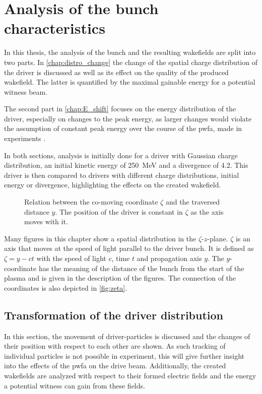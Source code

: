 \documentclass[bachelor_thesis]{subfiles}
\begin{document}
\chapter{Analysis of the bunch characteristics}\label{chap:analysis}
In this thesis, the analysis of the bunch and the resulting wakefields are split into two parts. In \autoref{chap:distro_change} the change of the spatial charge distribution of the driver is discussed 
as well as its effect on the quality of the produced wakefield. The latter is quantified by the maximal gainable energy for a potential witness beam.

The second part in \autoref{chap:E_shift} focuses on the energy distribution of the driver, especially on changes to the peak energy, 
as larger changes would violate the assumption of constant peak energy over the course of the \gls{pwfa}, made in experiments \cite{Schoebel2022}.

In both sections, analysis is initially done for a driver with Gaussian charge distribution, an initial kinetic energy of \qty{250}{\MeV} and a divergence of \qty{4.2}{\mrad}. 
This driver is then compared to drivers with different charge distributions, initial energy or divergence, highlighting the effects on the created wakefield. 

\begin{figure}
	\centering
	
	\caption{Relation between the co-moving coordinate $\zeta$ and the traversed distance $y$. The position of the driver is constant in $\zeta$ as the axis moves with it.}
	\label{fig:zeta}
\end{figure}
Many figures in this chapter show a spatial distribution in the $\zeta$-$z$-plane. $\zeta$ is  an axis that moves at the speed of light parallel to the driver bunch. It is defined as $\zeta=y-ct$ with the speed of light $c$, time $t$ and propagation axis $y$.
The $y$-coordinate has the meaning of the distance of the bunch from the start of the plasma and is given in the description of the figures. The connection of the coordinates is also depicted in \autoref{fig:zeta}. 

 
\section{Transformation of the driver distribution} \label{chap:distro_change}
In this section, the movement of driver-particles is discussed and the changes of their position with respect to each other are shown. As such tracking of individual particles is not possible in experiment,
this will give further insight into the effects of the \gls{pwfa} on the drive beam. Additionally, the created wakefields are analyzed with respect to their formed electric fields and the energy a potential witness can gain from these fields.
\end{document}
